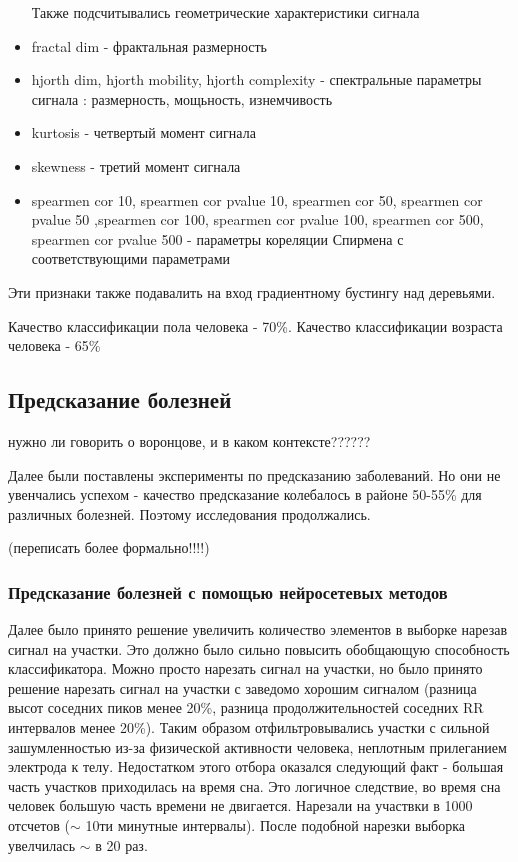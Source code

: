 \begin{itemize}
	Также подсчитывались геометрические характеристики сигнала
	
	\item fractal dim - фрактальная размерность
	\item hjorth dim, hjorth mobility, hjorth complexity - спектральные параметры сигнала : размерность, мощьность, изнемчивость
	\item kurtosis - четвертый момент сигнала
	\item skewness - третий момент сигнала
	\item spearmen cor 10, spearmen cor pvalue 10, spearmen cor 50, spearmen cor pvalue 50	
	,spearmen cor 100, spearmen cor pvalue 100, spearmen cor 500, spearmen cor pvalue 500 - 
	параметры кореляции Спирмена с соответствующими параметрами
\end{itemize}
Эти признаки также подавалить на вход градиентному бустингу над деревьями. 

Качество классификации пола человека - 70\%.
Качество классификации возраста человека - 65\%

\subsection{Предсказание болезней}

нужно ли говорить о воронцове, и в каком контексте??????

Далее были поставлены эксперименты по предсказанию заболеваний. Но они не увенчались успехом - качество предсказание колебалось в районе 50-55\% для различных болезней. Поэтому исследования продолжались.  

(переписать более формально!!!!)

\subsubsection{Предсказание болезней с помощью нейросетевых методов}

Далее было принято решение увеличить количество элементов в выборке нарезав сигнал на участки. Это должно было сильно повысить обобщающую способность классификатора. Можно просто нарезать сигнал на участки, но было принято решение нарезать сигнал на участки с заведомо хорошим сигналом (разница высот соседних пиков менее 20\%, разница продолжительностей соседних RR интервалов менее 20\%). Таким образом отфильтровывались участки с сильной зашумленностью из-за физической активности человека, неплотным прилеганием электрода к телу. Недостатком этого отбора оказался следующий факт - большая часть участков приходилась на время сна. Это логичное следствие, во время сна человек большую часть времени не двигается. Нарезали на участвки в 1000 отсчетов ($\sim$ 10ти минутные интервалы). После подобной нарезки выборка увелчилась $\sim$ в 20 раз.

